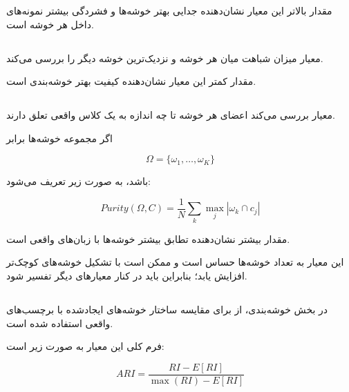 مقدار بالاتر این معیار نشان‌دهنده جدایی بهتر خوشه‌ها و فشردگی بیشتر نمونه‌های داخل هر خوشه است.

\subsection{}

معیار
میزان شباهت میان هر خوشه و نزدیک‌ترین خوشه دیگر را بررسی می‌کند.

مقدار کمتر این معیار نشان‌دهنده کیفیت بهتر خوشه‌بندی است.
\subsection{}

معیار
بررسی می‌کند اعضای هر خوشه تا چه اندازه به یک کلاس واقعی تعلق دارند.

اگر مجموعه خوشه‌ها برابر

\begin{equation}
\Omega
=
\{\omega_1,\ldots,\omega_K\}
\end{equation}

باشد،
به صورت زیر تعریف می‌شود:

\begin{equation}
Purity(\Omega,C)
=
\frac{1}{N}
\sum_k
\max_j
|\omega_k\cap c_j|
\end{equation}

مقدار بیشتر
نشان‌دهنده تطابق بیشتر خوشه‌ها با زبان‌های واقعی است.

این معیار به تعداد خوشه‌ها حساس است و ممکن است با تشکیل خوشه‌های کوچک‌تر افزایش یابد؛ بنابراین باید در کنار معیارهای دیگر تفسیر شود.


\subsection{}

در بخش خوشه‌بندی، از
برای مقایسه ساختار خوشه‌های ایجادشده با برچسب‌های واقعی استفاده شده است.

فرم کلی این معیار به صورت زیر است:

\begin{equation}
ARI
=
\frac{
RI-E[RI]
}{
\max(RI)-E[RI]
}
\end{equation}

